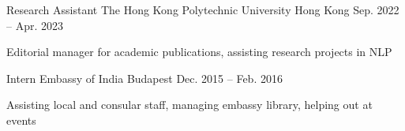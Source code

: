 
\begin{cventries}

  \cventry
    {Research Assistant} %
    {The Hong Kong Polytechnic University} %
    {Hong Kong} %
    {Sep. 2022 -- Apr. 2023} %
    {
      \begin{cvitems} %
        \item {Editorial manager for academic publications, assisting research projects in NLP}
      \end{cvitems}
    }

  \cventry
    {Intern} %
    {Embassy of India} %
    {Budapest} %
    {Dec. 2015 -- Feb. 2016} %
    {
      \begin{cvitems} %
        \item {Assisting local and consular staff, managing embassy library, helping out at events}
      \end{cvitems}
    }

\end{cventries}
